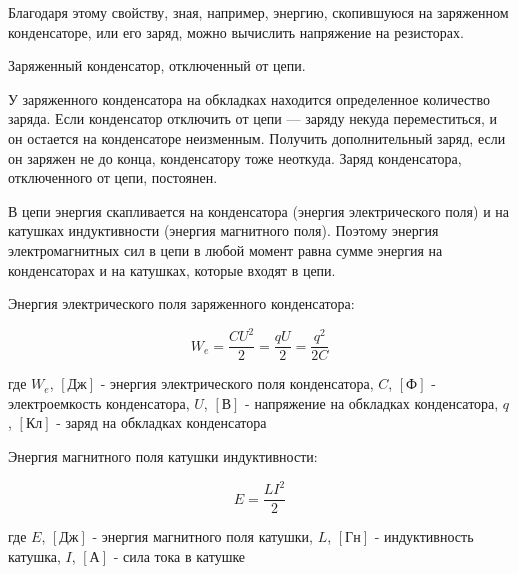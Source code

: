 Благодаря этому свойству, зная, например, энергию, скопившуюся на заряженном конденсаторе, или его заряд, можно 
вычислить напряжение на резисторах.

\begin{definition}
    Заряженный конденсатор, отключенный от цепи.

    У заряженного конденсатора на обкладках находится определенное количество заряда. 
    Если конденсатор отключить от цепи — заряду некуда переместиться, и он остается на конденсаторе неизменным. 
    Получить дополнительный заряд, если он заряжен не до конца, конденсатору тоже неоткуда. Заряд конденсатора, 
    отключенного от цепи, постоянен.
\end{definition}

В цепи энергия скапливается на конденсатора (энергия электрического поля) и на катушках индуктивности 
(энергия магнитного поля). Поэтому энергия электромагнитных сил в цепи в любой момент равна сумме энергия на 
конденсаторах и на катушках, которые входят в цепи.

Энергия электрического поля заряженного конденсатора:

$$
W_e=\frac{CU^2}{2}=\frac{qU}{2}=\frac{q^2}{2C}
$$

где $W_e$, $[Дж]$ - энергия электрического поля конденсатора,
$C$, $[Ф]$ - электроемкость конденсатора,
$U$, $[В]$ - напряжение на обкладках конденсатора,
$q$, $[Кл]$ - заряд на обкладках конденсатора

Энергия магнитного поля катушки индуктивности:

$$
E=\frac{LI^2}{2}
$$

где $E$, $[Дж]$ - энергия магнитного поля катушки,
$L$, $[Гн]$ - индуктивность катушка,
$I$, $[А]$ - сила тока в катушке